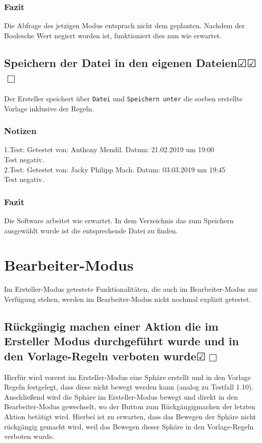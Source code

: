\documentclass[enabledeprecatedfontcommands]{scrartcl}
\newcommand{\subsectiont}[2]{\subsection[#1]{#1{\normalsize\normalfont #2}}}
\newcommand{\leer}{$\Box$}
\newcommand{\ok}{$\CheckedBox$}
\begin{document}
\subsubsection{Fazit} 
Die Abfrage des jetzigen Modus entsprach nicht dem geplanten. Nachdem der Boolesche Wert negiert worden ist, funktioniert dies nun wie erwartet.

\subsectiont{Speichern der Datei in den eigenen Dateien}{\dotfill\ok\ok\leer}
Der Ersteller speichert über \texttt{Datei} und \texttt{Speichern unter} die soeben erstellte Vorlage inklusive der Regeln. 
\subsubsection{Notizen}
1.Test: Getestet von: Anthony Mendil. Datum: 21.02.2019 um 19:00 \\
Test negativ.\\
2.Test: Getestet von: Jacky Philipp Mach. Datum: 03.03.2019 um 19:45 \\
Test negativ.
\subsubsection{Fazit}
Die Software arbeitet wie erwartet. In dem Verzeichnis das zum Speichern ausgewählt wurde ist die entsprechende Datei zu finden. 

\newpage

\section{Bearbeiter-Modus}
Im Ersteller-Modus getestete Funktionalitäten, die auch im Bearbeiter-Modus zur Verfügung stehen, werden im Bearbeiter-Modus nicht nochmal explizit getestet. 

\subsectiont{Rückgängig machen einer Aktion die im Ersteller Modus durchgeführt wurde und in den Vorlage-Regeln verboten wurde}{\dotfill\XBox\ok\leer}
Hierfür wird vorerst im Ersteller-Modus eine Sphäre erstellt und in den Vorlage Regeln festgelegt, dass diese nicht bewegt werden kann (analog zu Testfall 1.10). Anschließend wird die Sphäre im Ersteller-Modus bewegt und direkt in den Bearbeiter-Modus gewechselt, wo der Button zum Rückgängigmachen der letzten Aktion betätigt wird. Hierbei ist zu erwarten, dass das Bewegen der Sphäre nicht rückgängig gemacht wird, weil das Bewegen dieser Sphäre in den Vorlage-Regeln verboten wurde. 
\end{document}
